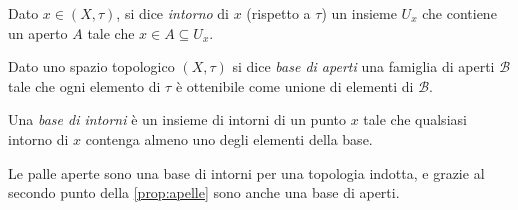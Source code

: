 



\begin{defn}[Intorno]
	Dato $x \in (X,\tau)$,
	si dice \emph{intorno} di $x$ (rispetto a $\tau$)
	un insieme $U_x$ che contiene un aperto $A$ tale che $x \in A \subseteq U_x$.
\end{defn}

\begin{defn}
	Dato uno spazio topologico $(X,\tau)$
	si dice \emph{base di aperti} una famiglia di aperti $\mathcal B$
	tale che ogni elemento di $\tau$ è ottenibile come unione di elementi di $\mathcal B$.
\end{defn}

\begin{defn}
	Una \emph{base di intorni} è un insieme di intorni di un punto $x$
	tale che qualsiasi intorno di $x$ contenga almeno uno degli elementi della base.
\end{defn}

\begin{oss}
	Le palle aperte sono una base di intorni per una topologia indotta,
	e grazie al secondo punto della \autoref{prop:apelle} sono anche una base di aperti.
\end{oss}
